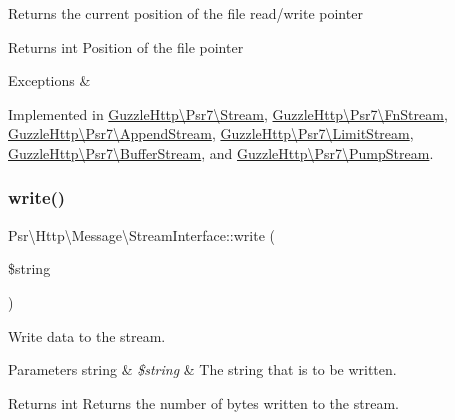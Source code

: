 Returns the current position of the file read/write pointer

\begin{DoxyReturn}{Returns}
int Position of the file pointer 
\end{DoxyReturn}

\begin{DoxyExceptions}{Exceptions}
{\em } & \\
\hline
\end{DoxyExceptions}


Implemented in \hyperlink{classGuzzleHttp_1_1Psr7_1_1Stream_a8340644980841db5830ef26a661dcc6d}{Guzzle\+Http\textbackslash{}\+Psr7\textbackslash{}\+Stream}, \hyperlink{classGuzzleHttp_1_1Psr7_1_1FnStream_ada664b3551d9ec37a20ded966d930508}{Guzzle\+Http\textbackslash{}\+Psr7\textbackslash{}\+Fn\+Stream}, \hyperlink{classGuzzleHttp_1_1Psr7_1_1AppendStream_a011a51b4b1ef1f4b604f64b234be3e77}{Guzzle\+Http\textbackslash{}\+Psr7\textbackslash{}\+Append\+Stream}, \hyperlink{classGuzzleHttp_1_1Psr7_1_1LimitStream_a7f3f1d99ade05ec436b34d32886defdf}{Guzzle\+Http\textbackslash{}\+Psr7\textbackslash{}\+Limit\+Stream}, \hyperlink{classGuzzleHttp_1_1Psr7_1_1BufferStream_aac11a7ec7fcae9038f7beb6f374111a9}{Guzzle\+Http\textbackslash{}\+Psr7\textbackslash{}\+Buffer\+Stream}, and \hyperlink{classGuzzleHttp_1_1Psr7_1_1PumpStream_af59623b18ca8aec9aa2bbe09b1a3778e}{Guzzle\+Http\textbackslash{}\+Psr7\textbackslash{}\+Pump\+Stream}.

\mbox{\label{interfacePsr_1_1Http_1_1Message_1_1StreamInterface_aabf9fe3e09f85753834cdb69bbdf3c3d}} 
\subsubsection{\texorpdfstring{write()}{write()}}
{\footnotesize\ttfamily Psr\textbackslash{}\+Http\textbackslash{}\+Message\textbackslash{}\+Stream\+Interface\+::write (\begin{DoxyParamCaption}\item[{}]{\$string }\end{DoxyParamCaption})}

Write data to the stream.


\begin{DoxyParams}[1]{Parameters}
string & {\em \$string} & The string that is to be written. \\
\hline
\end{DoxyParams}
\begin{DoxyReturn}{Returns}
int Returns the number of bytes written to the stream. 
\end{DoxyReturn}

